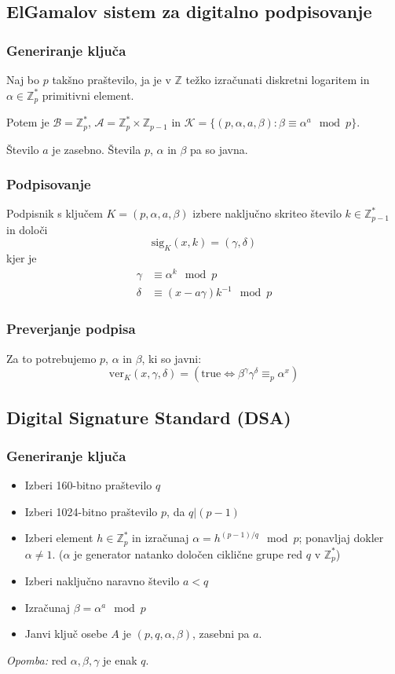 \begin{multicols}{5}
\subsection*{ElGamalov sistem za digitalno podpisovanje}
\subsubsection*{Generiranje ključa}
Naj bo $p$ takšno praštevilo, ja je v $\mathbb{Z}$ težko izračunati diskretni logaritem in $\alpha \in \mathbb{Z}_p^*$ primitivni element.

Potem je $\mathcal{B} = \mathbb{Z}_p^*$, $\mathcal{A} = \mathbb{Z}_p^* \times \mathbb{Z}_{p-1}$ in 
$\mathcal{K} = \{(p, \alpha, a, \beta) : \beta \equiv \alpha^a \mod p \}$.

Število $a$ je zasebno. Števila $p$, $\alpha$ in $\beta$ pa so javna.

\subsubsection*{Podpisovanje}
Podpisnik s ključem $K = (p, \alpha, a, \beta)$ izbere naključno skriteo število $k \in \mathbb{Z}_{p-1}^*$ in določi
\[ \text{sig}_K(x, k) = (\gamma, \delta)\]
kjer je
\begin{align*}
	\gamma &\equiv \alpha^k \mod p \\
	\delta &\equiv (x - a\gamma) k^{-1} \mod p
\end{align*}

\subsubsection*{Preverjanje podpisa}
Za to potrebujemo $p$, $\alpha$ in $\beta$, ki so javni:
\[ \text{ver}_K(x, \gamma, \delta) = \left( \text{true} \iff \beta^\gamma \gamma^\delta \equiv_p \alpha^x \right)\]

\subsection*{Digital Signature Standard (DSA)}
\subsubsection*{Generiranje ključa}
\begin{itemize}
	\item Izberi 160-bitno praštevilo $q$
	\item Izberi 1024-bitno praštevilo $p$, da $q|(p-1)$
	\item Izberi element $h \in \mathbb{Z}_p^*$ in izračunaj $\alpha = h^{(p-1)/q} \mod p$; ponavljaj dokler $\alpha \neq 1$. ($\alpha$ je generator natanko določen ciklične grupe red $q$ v $\mathbb{Z}_p^*$)
	\item Izberi naključno naravno število $a < q$
	\item Izračunaj $\beta = \alpha^a \mod p$
	\item Janvi ključ osebe $A$ je $(p, q, \alpha, \beta)$, zasebni pa $a$.
\end{itemize}
\textit{Opomba:} red $\alpha, \beta, \gamma$ je enak $q$.


\end{multicols}
